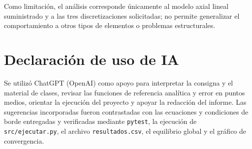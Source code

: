 \documentclass[11pt]{article}
\begin{document}
Como limitación, el análisis corresponde únicamente al modelo axial lineal suministrado y a las tres discretizaciones solicitadas; no permite generalizar el comportamiento a otros tipos de elementos o problemas estructurales.

\section*{Declaración de uso de IA}

Se utilizó ChatGPT (OpenAI) como apoyo para interpretar la consigna y el material de clases, revisar las funciones de referencia analítica y error en puntos medios, orientar la ejecución del proyecto y apoyar la redacción del informe. Las sugerencias incorporadas fueron contrastadas con las ecuaciones y condiciones de borde entregadas y verificadas mediante \texttt{pytest}, la ejecución de \texttt{src/ejecutar.py}, el archivo \texttt{resultados.csv}, el equilibrio global y el gráfico de convergencia.



\end{document}
